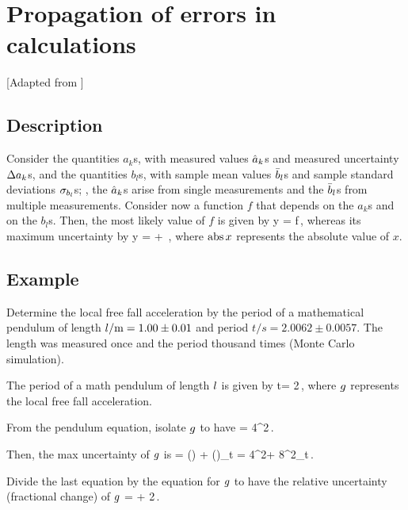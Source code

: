 \chapter*{Propagation of errors in calculations}
%
[Adapted from \citep[p. 47]{oldenburg:2014}]


\newcommand{\period}{t}


\section*{Description}
%
Consider the quantities $a_k$s, with measured values $\mvalue a_k$s and measured uncertainty $\muncer a_k$s, and the quantities $b_l$s, with sample mean values $\smean b_l$s and sample standard deviations $\sstdev_{b_l}$s; \ie, the $\mvalue a_k$s arise from single measurements and the $\smean b_l$s from multiple measurements. Consider now a function $f$ that depends on the $a_k$s and on the $b_l$s. Then, the most likely value of $f$ is given by
%
\beq
    \mvalue y = f\,,
\eeq
%
whereas its maximum uncertainty by
%
\beq
    \muncer y =  
                + \,,
\eeq
%
where $\abs x$ represents the absolute value of $x$.


\section*{Example}
%
Determine the local free fall acceleration by the period of a mathematical pendulum of length $\length/\si{m} = 1.00 \pm 0.01$ and period $\period/\si{s} = 2.0062 \pm 0.0057$. The length was measured once and the period thousand times (Monte Carlo simulation).

The period of a math pendulum of length $\length$ is given by
%
\beq
    \period = 2\pi\sqrt{\dfrac{\length}{\grav}}\,,
\eeq
%
where $\grav$ represents the local free fall acceleration.

From the pendulum equation, isolate $\grav$ to have
%
\beq
    \grav = 4\pi^2\dfrac{\length}{\period^2}\,.
\eeq

Then, the max uncertainty of $\grav$ is
%
\beq
    \muncer\grav = \abs\left(\ipd{\length}\grav\right)\muncer\length 
                   + \abs\left(\ipd{\period}\grav\right)\sstdev_\period
                 = 4\pi^2\dfrac{1}{\period^2}\muncer\length + 8\pi^2\dfrac{\length}{\period^3}\sstdev_\period\,.
\eeq

Divide the last equation by the equation for $\grav$ to have the relative uncertainty (fractional change) of $\grav$
%
\beq
    \dfrac{\muncer\grav}{\grav} = \dfrac{\muncer\length}{\length} + 2\dfrac{\sstdev_\period}{\period}\,.
\eeq

